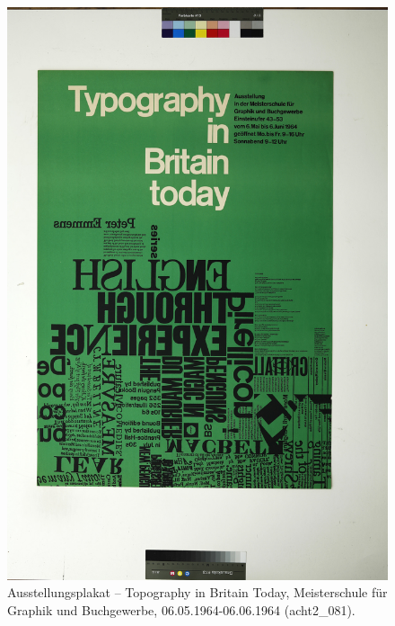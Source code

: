 \documentclass[a4paper,12pt,ngerman]{article}
\begin{document}
\newpage
\begin{figure}[ht]
\includegraphics[width=\linewidth]{Abbildung_16_(acht2_081)}
\centering
\caption{Ausstellungsplakat – Topography in Britain Today, Meisterschule für Graphik und Buchgewerbe, 06.05.1964-06.06.1964 (acht2\_081).}
\end{figure}
\end{document}
